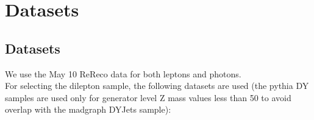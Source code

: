 
\section{Datasets}
\label{sec:datasets}

\subsection{Datasets}

We use the May 10 ReReco data for both leptons and photons.
\\
For selecting the dilepton sample, the following datasets are used (the pythia DY samples are used only for generator level Z mass values less than 50 to avoid overlap with the madgraph DYJets sample):


